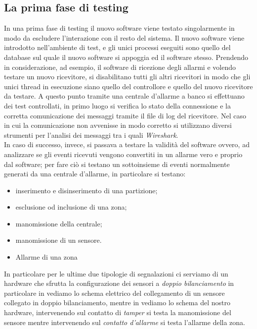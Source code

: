 \subsection{La prima fase di testing}
In una prima fase di testing il nuovo software viene testato singolarmente in modo da escludere l'interazione con il resto del sistema. Il nuovo software viene introdotto nell'ambiente di test, e gli unici processi eseguiti sono quello del database sul quale il nuovo software si appoggia ed il software stesso. Prendendo in considerazione, ad esempio, il software di ricezione degli allarmi e volendo testare un nuovo ricevitore, si disabilitano tutti gli altri ricevitori in modo che gli unici thread in esecuzione siano quello del controllore e quello del nuovo ricevitore da testare. A questo punto tramite una centrale d'allarme a banco si effettuano dei test controllati, in primo luogo si verifica lo stato della connessione e la corretta comunicazione dei messaggi tramite il file di log del ricevitore. Nel caso in cui la comunicazione non avvenisse in modo corretto si utilizzano diversi strumenti per l'analisi dei messaggi tra i quali \emph{Wireshark}\cite{wireshark}.\\
In caso di successo, invece, si passava a testare la validità del software ovvero, ad analizzare se gli eventi ricevuti vengono convertiti in un allarme vero e proprio dal software; per fare ciò si testano un sottoinsieme di eventi normalmente generati da una centrale d'allarme, in particolare si testano:
\begin{itemize}
	\item inserimento e disinserimento di una partizione;
	\item esclusione od inclusione di una zona;
	\item manomissione della centrale;
	\item manomissione di un sensore.
	\item Allarme di una zona
\end{itemize}
In particolare per le ultime due tipologie di segnalazioni ci serviamo di un hardware che sfrutta la configurazione dei sensori a \emph{doppio bilanciamento} in particolare in  vediamo lo schema elettrico del collegamento di un sensore collegato in doppio bilanciamento, mentre in  vediamo lo schema del nostro hardware, intervenendo sul contatto di \emph{tamper} si testa la manomissione del sensore mentre intervenendo sul \emph{contatto d'allarme} si testa l'allarme della zona.
